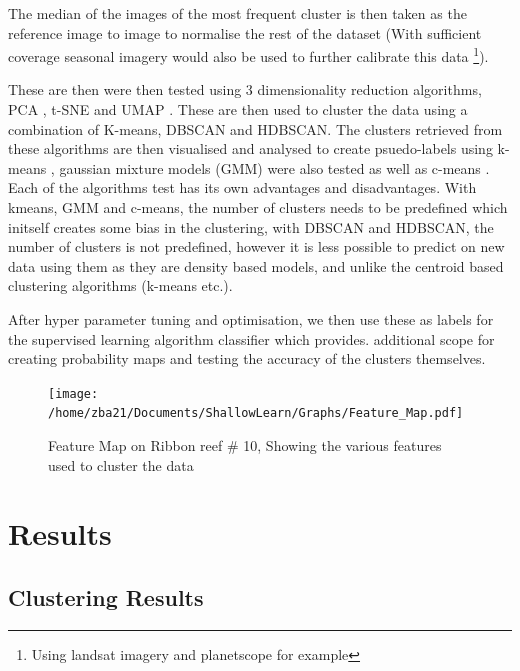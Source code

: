 \documentclass[journal,article,submit,pdftex,moreauthors]{Definitions/mdpi}
\begin{document}
The median of the images of the most frequent cluster is then taken as the reference image to image to normalise the rest of the dataset (With sufficient coverage seasonal imagery would also be used to further calibrate this data \footnote{Using landsat imagery and planetscope for example}).

These are then were then tested using 3 dimensionality reduction algorithms, PCA \cite{pearson1901}, t-SNE \cite{van2008visualizing} and UMAP \cite{mcinnes2018umap}. These are then used to cluster the data using a combination of K-means, DBSCAN and HDBSCAN. The clusters retrieved from these algorithms 
are then visualised and analysed to create psuedo-labels using k-means \cite{macqueen1967some}, gaussian mixture models (GMM) were also tested \cite{rasmussen1999infinite} as well as c-means \cite{bezdek1984fcm}. Each of the algorithms test has its own advantages and disadvantages. With kmeans, GMM and c-means, 
the number of clusters needs to be predefined which initself creates some bias in the clustering, with DBSCAN and HDBSCAN, the number of clusters is not predefined, however it is less possible to predict on new data using them as they are density based models, and unlike the centroid based clustering algorithms (k-means etc.).




After hyper parameter tuning and optimisation, we then use these as labels for the supervised learning algorithm classifier which provides.
additional scope for creating probability maps and testing the accuracy of the clusters themselves. 

\begin{figure}
	\centering
	\texttt{[image: /home/zba21/Documents/ShallowLearn/Graphs/Feature\_Map.pdf]}
	\caption{Feature Map on Ribbon reef \# 10, Showing the various features used to cluster the data}
	\label{fig:feature_map}
\end{figure}



\section{Results}

\subsection*{Clustering Results}
\end{document}
